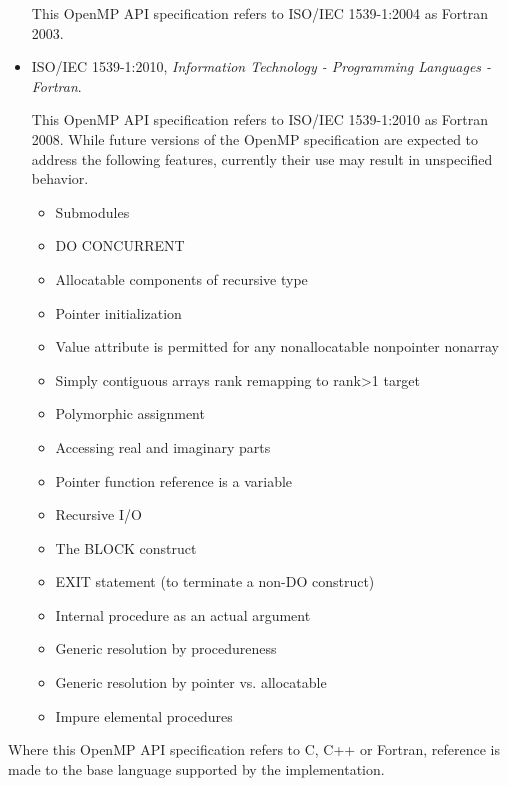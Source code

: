 \begin{itemize}
This OpenMP API specification refers to ISO/IEC 1539-1:2004 as Fortran 2003.

\item ISO/IEC 1539-1:2010, \textsl{Information Technology - Programming Languages - Fortran}.

This OpenMP API specification refers to ISO/IEC 1539-1:2010 as Fortran 2008. 
While future versions of the OpenMP specification are expected to
address the following features, currently their use may result in
unspecified behavior.

\begin{itemize}
\item Submodules
\item DO CONCURRENT
\item Allocatable components of recursive type
\item Pointer initialization
\item Value attribute is permitted for any nonallocatable nonpointer nonarray
\item Simply contiguous arrays rank remapping to rank>1 target
\item Polymorphic assignment
\item Accessing real and imaginary parts
\item Pointer function reference is a variable
\item Recursive I/O
\item The BLOCK construct
\item EXIT statement (to terminate a non-DO construct)
\item Internal procedure as an actual argument
\item Generic resolution by procedureness
\item Generic resolution by pointer vs. allocatable
\item Impure elemental procedures
\end{itemize}

\end{itemize}

Where this OpenMP API specification refers to C, C++ or Fortran, reference is made to
the base language supported by the implementation.

